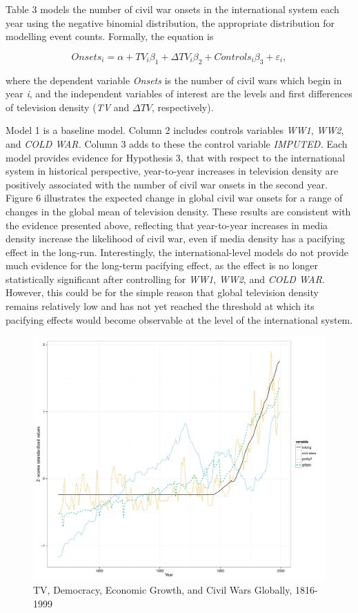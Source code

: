 \documentclass[11pt,article,oneside]{memoir}
\makeatletter
\def\maxwidth{\ifdim\Gin@nat@width>\linewidth\linewidth
\else\Gin@nat@width\fi}
\let\Oldincludegraphics\includegraphics
\renewcommand{\includegraphics}[1]{\Oldincludegraphics[width=\maxwidth]{#1}}
\makeatother
\begin{document}
Table 3 models the number of civil war onsets in the international
system each year using the negative binomial distribution, the
appropriate distribution for modelling event counts. Formally, the
equation is

\[ Onsets_{i} = \alpha + TV_{i} \beta_1 + \Delta TV_{i} \beta_2 + Controls_{i} \beta_3  + \varepsilon_{i}, \]

where the dependent variable \emph{Onsets} is the number of civil wars
which begin in year \emph{i}, and the independent variables of interest
are the levels and first differences of television density (\emph{TV}
and $\Delta TV$, respectively).

Model 1 is a baseline model. Column 2 includes controls variables
\emph{WW1}, \emph{WW2}, and \emph{COLD WAR.} Column 3 adds to these the
control variable \emph{IMPUTED.} Each model provides evidence for
Hypothesis 3, that with respect to the international system in
historical perspective, year-to-year increases in television density are
positively associated with the number of civil war onsets in the second
year. Figure 6 illustrates the expected change in global civil war
onsets for a range of changes in the global mean of television density.
These results are consistent with the evidence presented above,
reflecting that year-to-year increases in media density increase the
likelihood of civil war, even if media density has a pacifying effect in
the long-run. Interestingly, the international-level models do not
provide much evidence for the long-term pacifying effect, as the effect
is no longer statistically significant after controlling for \emph{WW1},
\emph{WW2}, and \emph{COLD WAR}. However, this could be for the simple
reason that global television density remains relatively low and has not
yet reached the threshold at which its pacifying effects would become
observable at the level of the international system.

\begin{figure}[htbp]
\centering
\includegraphics{media_civil_war_files/figure-markdown/longrunplot.pdf}
\caption{TV, Democracy, Economic Growth, and Civil Wars Globally,
1816-1999}
\end{figure}
\end{document}
